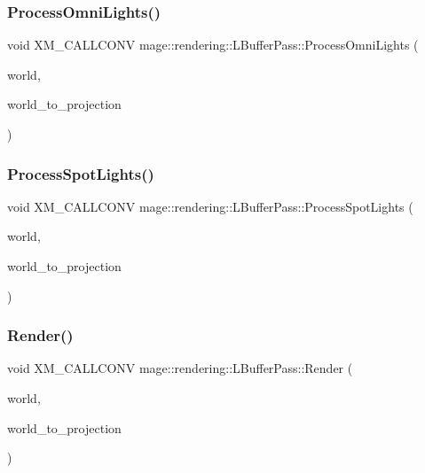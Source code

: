 \subsubsection{\texorpdfstring{Process\+Omni\+Lights()}{ProcessOmniLights()}}
{\footnotesize\ttfamily void X\+M\+\_\+\+C\+A\+L\+L\+C\+O\+NV mage\+::rendering\+::\+L\+Buffer\+Pass\+::\+Process\+Omni\+Lights (\begin{DoxyParamCaption}\item[{const \hyperlink{classmage_1_1rendering_1_1_world}{World} \&}]{world,  }\item[{F\+X\+M\+M\+A\+T\+R\+IX}]{world\+\_\+to\+\_\+projection }\end{DoxyParamCaption})\hspace{0.3cm}{\ttfamily [private]}}

\hypertarget{classmage_1_1rendering_1_1_l_buffer_pass_a3172ee6a91c34a1dbf252c388fe1ac20}{}\label{classmage_1_1rendering_1_1_l_buffer_pass_a3172ee6a91c34a1dbf252c388fe1ac20} 
\subsubsection{\texorpdfstring{Process\+Spot\+Lights()}{ProcessSpotLights()}}
{\footnotesize\ttfamily void X\+M\+\_\+\+C\+A\+L\+L\+C\+O\+NV mage\+::rendering\+::\+L\+Buffer\+Pass\+::\+Process\+Spot\+Lights (\begin{DoxyParamCaption}\item[{const \hyperlink{classmage_1_1rendering_1_1_world}{World} \&}]{world,  }\item[{F\+X\+M\+M\+A\+T\+R\+IX}]{world\+\_\+to\+\_\+projection }\end{DoxyParamCaption})\hspace{0.3cm}{\ttfamily [private]}}

\hypertarget{classmage_1_1rendering_1_1_l_buffer_pass_a21f63364edbb794e1a70823350e44601}{}\label{classmage_1_1rendering_1_1_l_buffer_pass_a21f63364edbb794e1a70823350e44601} 
\subsubsection{\texorpdfstring{Render()}{Render()}}
{\footnotesize\ttfamily void X\+M\+\_\+\+C\+A\+L\+L\+C\+O\+NV mage\+::rendering\+::\+L\+Buffer\+Pass\+::\+Render (\begin{DoxyParamCaption}\item[{const \hyperlink{classmage_1_1rendering_1_1_world}{World} \&}]{world,  }\item[{F\+X\+M\+M\+A\+T\+R\+IX}]{world\+\_\+to\+\_\+projection }\end{DoxyParamCaption})}

